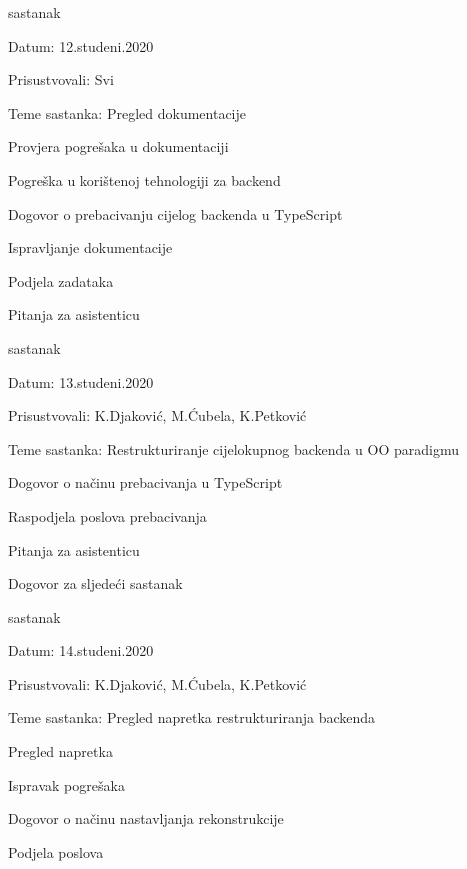 \begin{packed_enum}
			\item  sastanak
			\item[] \begin{packed_item}
				\item Datum: 12.studeni.2020
				\item Prisustvovali: Svi
				\item Teme sastanka: Pregled dokumentacije
				\begin{packed_item}
				    \item Provjera pogrešaka u dokumentaciji
					\item Pogreška u korištenoj tehnologiji za backend
					\item Dogovor o prebacivanju cijelog backenda u TypeScript
					\item Ispravljanje dokumentacije
					\item Podjela zadataka
					\item Pitanja za asistenticu
				\end{packed_item}
			\end{packed_item}
			
			\item  sastanak
			\item[] \begin{packed_item}
				\item Datum: 13.studeni.2020
				\item Prisustvovali: K.Djaković, M.Ćubela, K.Petković
				\item Teme sastanka: Restrukturiranje cijelokupnog backenda u OO paradigmu
				\begin{packed_item}
                    \item Dogovor o načinu prebacivanja u TypeScript
                    \item Raspodjela poslova prebacivanja
                    \item Pitanja za asistenticu
                    \item Dogovor za sljedeći sastanak
				\end{packed_item}
			\end{packed_item}
			
			\item  sastanak
			\item[] \begin{packed_item}
				\item Datum: 14.studeni.2020
				\item Prisustvovali: K.Djaković, M.Ćubela, K.Petković
				\item Teme sastanka: Pregled napretka restrukturiranja backenda
				\begin{packed_item}
                    \item Pregled napretka
                    \item Ispravak pogrešaka
                    \item Dogovor o načinu nastavljanja rekonstrukcije
                    \item Podjela poslova
				\end{packed_item}
			\end{packed_item}
			

\end{packed_enum}
